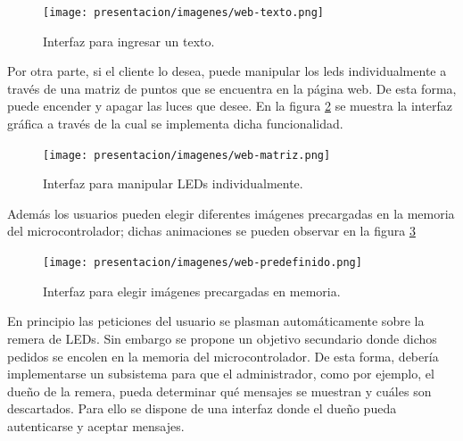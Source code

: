\begin{enumerate}[label=\alph*.]
    \begin{figure}[ht]
    	\centering
    	\begin{center}
    		\texttt{[image: presentacion/imagenes/web-texto.png]}
    		\caption{Interfaz para ingresar un texto.}
    		\label{fig:Prop-Web-text}
    	\end{center}
    \end{figure}
    
    Por otra parte, si el cliente lo desea, puede manipular los leds individualmente a través de una matriz de puntos que se encuentra en la página web. De esta forma, puede encender y apagar las luces que desee. En la figura \ref{fig:Prop-Web-matrix} se muestra la interfaz gráfica a través de la cual se implementa dicha funcionalidad.
    
    \begin{figure}[ht!]
    	\centering
    	\begin{center}
    		\texttt{[image: presentacion/imagenes/web-matriz.png]}
    		\caption{Interfaz para manipular LEDs individualmente.}
    		\label{fig:Prop-Web-matrix}
    	\end{center}
    \end{figure}
    
    Además los usuarios pueden elegir diferentes imágenes precargadas en la memoria del microcontrolador; dichas animaciones se pueden observar en la figura \ref{fig:Prop-Web-predefined}
    
    \begin{figure}[ht!]
    	\centering
    	\begin{center}
    		\texttt{[image: presentacion/imagenes/web-predefinido.png]}
    		\caption{Interfaz para elegir imágenes precargadas en memoria.}
    		\label{fig:Prop-Web-predefined}
    	\end{center}
    \end{figure}
    
    En principio las peticiones del usuario se plasman automáticamente sobre la remera de LEDs. Sin embargo se propone un objetivo secundario donde dichos pedidos se encolen en la memoria del microcontrolador. De esta forma, debería implementarse un subsistema para que el administrador, como por ejemplo, el dueño de la remera, pueda determinar qué mensajes se muestran y cuáles son descartados. Para ello se dispone de una interfaz donde el dueño pueda autenticarse y aceptar mensajes.
\end{enumerate}
    
